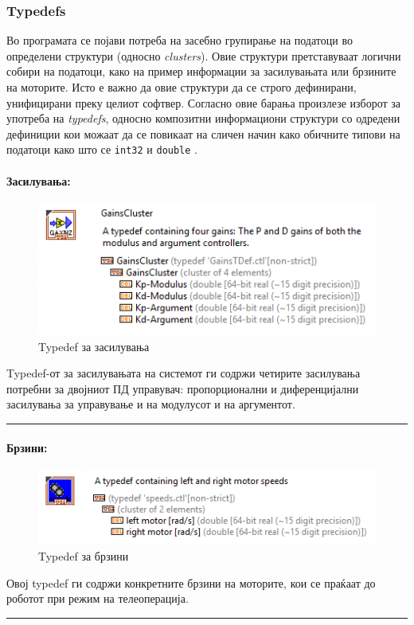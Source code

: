 \documentclass[11pt]{article}
\begin{document}
    \subsubsection{Typedefs}
      \label{sec:typedefs}
      Во програмата се појави потреба на засебно групирање на податоци во определени структури (односно \textit{clusters}). Овие структури претставуваат логични собири на податоци, како на пример информации за засилувањата или брзините на моторите. Исто е важно да овие структури да се строго дефинирани, унифицирани преку целиот софтвер. Согласно овие барања произлезе изборот за употреба на \textit{typedefs}, односно композитни информациони структури со одредени дефиниции кои можаат да се повикаат на сличен начин како обичните типови на податоци како што се \verb+int32+ и \verb+double+ \cite{lvforeveryone}.

      \paragraph{Засилувања:\\}
	      \begin{figure}[H]
	        \includegraphics[width=0.55\linewidth]{./images/typedef_gains_border.png}
		      \caption{Typedef за засилувања}
	        \label{fig:gain_typedef}
	        \raggedright
	        \end{figure}
        Typedef-от за засилувањата на системот ги содржи четирите засилувања потребни за двојниот ПД управувач: пропорционални и диференцијални засилувања за управување и на модулусот и на аргументот.\\
        \textcolor[RGB]{150,150,150}{\rule{\linewidth}{1.6pt}}

      \paragraph{Брзини:\\}
	      \begin{figure}[H]
	        \includegraphics[width=0.55\linewidth]{./images/typedef_speeds_border.png}
		      \caption{Typedef за брзини}
	        \label{fig:gain_typedef}
	        \raggedright
	        \end{figure}
	      Овој typedef ги содржи конкретните брзини на моторите, кои се праќаат до роботот при режим на телеоперација.\\
        \textcolor[RGB]{150,150,150}{\rule{\linewidth}{1.6pt}}
\end{document}
